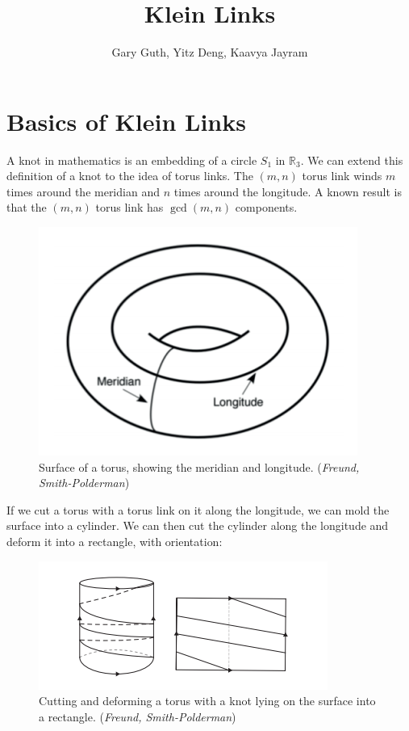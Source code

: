 \documentclass[12pt]{article}
\begin{document}
 
 
\title{Klein Links}
\author{Gary Guth, Yitz Deng, Kaavya Jayram}
\maketitle

\section{Basics of Klein Links}

A knot in mathematics is an embedding of a circle $S_1$ in $\mathbb{R}_3$. We can extend this definition of a knot to the idea of torus links. The $(m, n)$ torus link winds $m$ times around the meridian and $n$ times around the longitude. A known result is that the $(m,n)$ torus link has $\gcd(m,n)$ components.

\begin{figure}[H]
\centering
\includegraphics{meridianlongitude}
\caption{\label{Torus} Surface of a torus, showing the meridian and longitude. (\textit{Freund, Smith-Polderman})}
\end{figure}

If we cut a torus with a torus link on it along the longitude, we can mold the surface into a cylinder. We can then cut the cylinder along the longitude and deform it into a rectangle, with orientation:



\begin{figure}[H]
\centering
\includegraphics{deformtorusknot}
\caption{\label{Klein knot formation p1} Cutting and deforming a torus with a knot lying on the surface into a rectangle. (\textit{Freund, Smith-Polderman})}
\end{figure}
\end{document}
